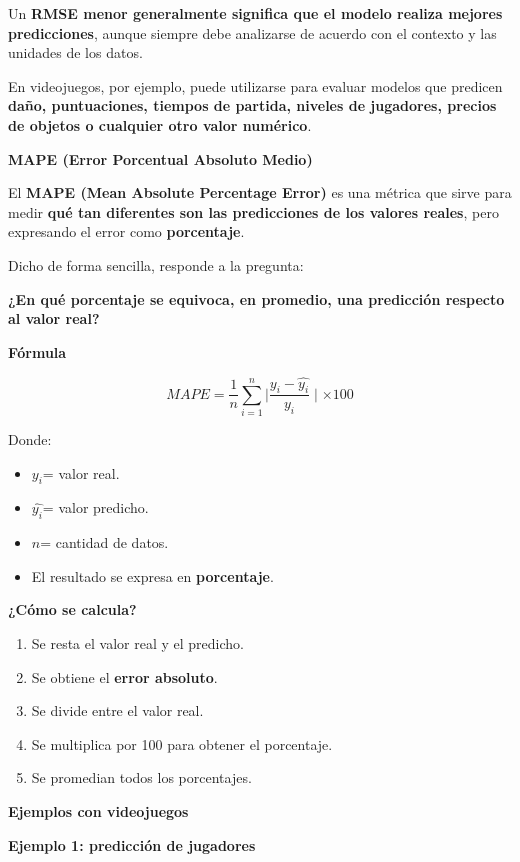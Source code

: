 \documentclass[]{article}
\begin{document}
Un \textbf{RMSE menor generalmente significa que el modelo realiza
mejores predicciones}, aunque siempre debe analizarse de acuerdo con el
contexto y las unidades de los datos.

En videojuegos, por ejemplo, puede utilizarse para evaluar modelos que
predicen \textbf{daño, puntuaciones, tiempos de partida, niveles de
jugadores, precios de objetos o cualquier otro valor numérico}.

\textbf{MAPE (Error Porcentual Absoluto Medio)}

El \textbf{MAPE (Mean Absolute Percentage Error)} es una métrica que
sirve para medir \textbf{qué tan diferentes son las predicciones de los
valores reales}, pero expresando el error como \textbf{porcentaje}.

Dicho de forma sencilla, responde a la pregunta:

\textbf{¿En qué porcentaje se equivoca, en promedio, una predicción
respecto al valor real?}

\textbf{Fórmula}

\[MAPE = \frac{1}{n}\sum_{i = 1}^{n}\left. \mid\frac{y_{i} - \widehat{y_{i}}}{y_{i}} \right.\mid \times 100\]

Donde:

\begin{itemize}
\item
  \(y_{i}\)= valor real.
\item
  \(\widehat{y_{i}}\)= valor predicho.
\item
  \(n\)= cantidad de datos.
\item
  El resultado se expresa en \textbf{porcentaje}.
\end{itemize}

\textbf{¿Cómo se calcula?}

\begin{enumerate}
\def\labelenumi{\arabic{enumi}.}
\item
  Se resta el valor real y el predicho.
\item
  Se obtiene el \textbf{error absoluto}.
\item
  Se divide entre el valor real.
\item
  Se multiplica por 100 para obtener el porcentaje.
\item
  Se promedian todos los porcentajes.
\end{enumerate}

\textbf{Ejemplos con videojuegos}

\textbf{Ejemplo 1: predicción de jugadores}
\end{document}
